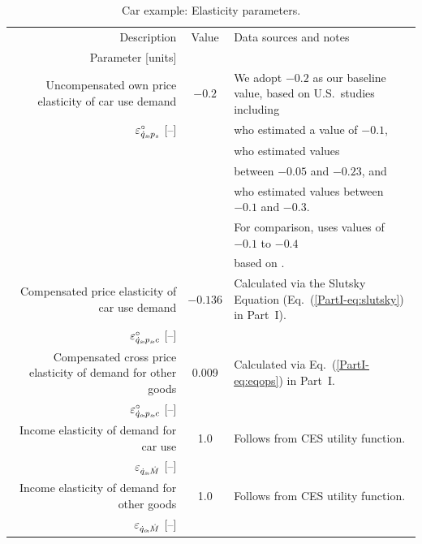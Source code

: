 \documentclass[12pt]{article}\usepackage[]{graphicx}\usepackage[]{xcolor}
\begin{document}
\begin{landscape}
\begin{table}
\footnotesize
\begin{center}
\caption{Car example: Elasticity parameters.}
\label{tab:car_elasticity_parameters}
\begin{tabular}{ r c l }
  \toprule
  Description & Value & Data sources and notes \\
  Parameter [units] & & \\
  \midrule
  Uncompensated own price elasticity of car use demand  & $-0.2$  & We adopt $-0.2$ as our baseline value, based on U.S.\ studies including \\
  $\varepsilon^\circ_{\dot{q}_s\!,p_s}$ [--]                                           &           &  \citet{Gillingham:2020aa} who estimated a value of $-0.1$, \\
                                                           &           &   \citet{goetzke2018} who estimated values \\
                                                           &          &     between $-0.05$ and $-0.23$, and \citet{Parry2005} \\  
                                                             &           &   who estimated values between $-0.1$ and $-0.3$. \\  
                                                            &           &  For comparison, \citet{Borenstein:2015aa} uses values of $-0.1$ to $-0.4$ \\   
                                                            &            &     based on \citet{Parry2005}. \\
  \midrule
  Compensated price elasticity of car use demand                   &   $-0.136$   & Calculated via the Slutsky Equation (Eq.~(\ref{PartI-eq:slutsky}) in Part~I).  \\
  $\varepsilon^\circ_{\dot{q}_s\!,p_s\!,c}$ [--]                                           &                                &   \\    
  \midrule   
  Compensated cross price elasticity of demand for other goods        &   0.009     & Calculated via Eq.~(\ref{PartI-eq:eqops}) in Part~I.  \\
  $\varepsilon^\circ_{\dot{q}_o\!,p_s\!,c}$ [--]                                           &                                &   \\ 
  \midrule   
  Income elasticity of demand for car use                 &   1.0      & Follows from CES utility function. \\
  $\varepsilon_{\dot{q}_s\!,\dot{M}}$ [--]                                            &                                &   \\ 
  \midrule   
  Income elasticity of demand for other goods             &   1.0      & Follows from CES utility function. \\
  $\varepsilon_{\dot{q}_o\!,\dot{M}}$ [--]                                            &                                &   \\
  \bottomrule
\end{tabular}
\end{center}
\end{table}
\end{landscape}
\end{document}
